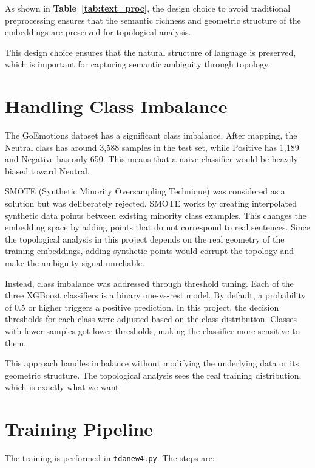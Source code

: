 As shown in \textbf{Table~\ref{tab:text_proc}}, the design choice to avoid traditional preprocessing
ensures that the semantic richness and geometric structure of the embeddings are preserved for
topological analysis.

This design choice ensures that the natural structure of language is preserved, which is important
for capturing semantic ambiguity through topology.

\section{Handling Class Imbalance}

The GoEmotions dataset has a significant class imbalance. After mapping, the Neutral class has
around 3,588 samples in the test set, while Positive has 1,189 and Negative has only 650. This
means that a naive classifier would be heavily biased toward Neutral.

SMOTE (Synthetic Minority Oversampling Technique) was considered as a solution but was
deliberately rejected. SMOTE works by creating interpolated synthetic data points between
existing minority class examples. This changes the embedding space by adding points that do
not correspond to real sentences. Since the topological analysis in this project depends on the
real geometry of the training embeddings, adding synthetic points would corrupt the topology
and make the ambiguity signal unreliable.

Instead, class imbalance was addressed through threshold tuning. Each of the three XGBoost
classifiers is a binary one-vs-rest model. By default, a probability of 0.5 or higher triggers a
positive prediction. In this project, the decision thresholds for each class were adjusted based
on the class distribution. Classes with fewer samples got lower thresholds, making the classifier
more sensitive to them.

This approach handles imbalance without modifying the underlying data or its geometric
structure. The topological analysis sees the real training distribution, which is exactly what we
want.

\section{Training Pipeline}

The training is performed in \texttt{tdanew4.py}. The steps are:

